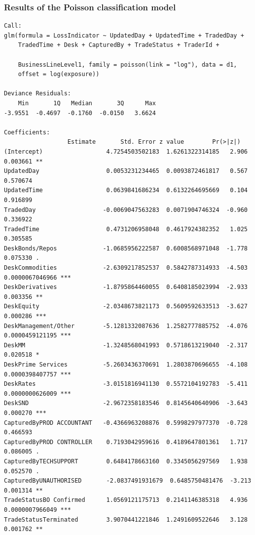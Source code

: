 \documentclass[a4paper]{article}
\begin{document}
\subsubsection{Results of the Poisson classification model}
\begin{verbatim}
Call:
glm(formula = LossIndicator ~ UpdatedDay + UpdatedTime + TradedDay + 
    TradedTime + Desk + CapturedBy + TradeStatus + TraderId + 

    BusinessLineLevel1, family = poisson(link = "log"), data = d1, 
    offset = log(exposure))

Deviance Residuals: 
    Min       1Q   Median       3Q      Max  
-3.9551  -0.4697  -0.1760  -0.0150   3.6624  

Coefficients:
                  Estimate       Std. Error z value        Pr(>|z|)    
(Intercept)                  4.7254503502183  1.6261322314185   2.906        0.003661 ** 
UpdatedDay                   0.0053231234465  0.0093872461817   0.567        0.570674    
UpdatedTime                  0.0639841686234  0.6132264695669   0.104        0.916899    
TradedDay                   -0.0069047563283  0.0071904746324  -0.960        0.336922    
TradedTime                   0.4731206958048  0.4617924382352   1.025        0.305585    
DeskBonds/Repos             -1.0685956222587  0.6008568971048  -1.778        0.075330 .  
DeskCommodities             -2.6309217852537  0.5842787314933  -4.503 0.0000067046966 ***
DeskDerivatives             -1.8795864460055  0.6408185023994  -2.933        0.003356 ** 
DeskEquity                  -2.0348673821173  0.5609592633513  -3.627        0.000286 ***
DeskManagement/Other        -5.1281332087636  1.2582777885752  -4.076 0.0000459121195 ***
DeskMM                      -1.3248568041993  0.5718613219040  -2.317        0.020518 *  
DeskPrime Services          -5.2603436370691  1.2803870696655  -4.108 0.0000398407757 ***
DeskRates                   -3.0151816941130  0.5572104192783  -5.411 0.0000000626009 ***
DeskSND                     -2.9672358183546  0.8145640640906  -3.643        0.000270 ***
CapturedByPROD ACCOUNTANT   -0.4366963208876  0.5998297977370  -0.728        0.466593    
CapturedByPROD CONTROLLER    0.7193042959616  0.4189647801361   1.717        0.086005 .  
CapturedByTECHSUPPORT        0.6484178663160  0.3345056297569   1.938        0.052570 .  
CapturedByUNAUTHORISED       -2.0837491931679  0.6485750481476  -3.213        0.001314 ** 
TradeStatusBO Confirmed      1.0569121175713  0.2141146385318   4.936 0.0000007966049 ***
TradeStatusTerminated        3.9070441221846  1.2491609522646   3.128        0.001762 ** 

\end{verbatim}
\end{document}
